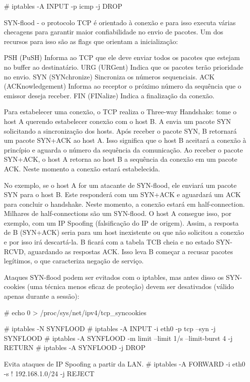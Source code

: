 # iptables -A INPUT -p icmp -j DROP

SYN-flood - o protocolo TCP é orientado à conexão e para isso executa várias checagens para garantir maior confiabilidade no envio de pacotes. Um dos recursos para isso são as flags que orientam a inicialização:

PSH (PuSH) Informa ao TCP que ele deve enviar todos os pacotes que estejam no buffer ao destinatário.
URG (URGent) Indica que os pacotes terão prioridade no envio.
SYN (SYNchronize) Sincroniza os números sequenciais.
ACK (ACKnowledgement) Informa ao receptor o próximo número da sequência que o emissor deseja receber.
FIN (FINalize) Indica a finalização da conexão.

Para estabelecer uma conexão, o TCP realiza o Three-way Handshake: tome o host A querendo estabelecer conexão com o host B. A envia um pacote SYN solicitando a sincronização dos hosts. Após receber o pacote SYN, B retornará um pacote SYN+ACK ao host A. Isso significa que o host B aceitará a conexão à princípio e aguarda o número da sequência da comunicação. Ao receber o pacote SYN+ACK, o host A retorna ao host B a sequência da conexão em um pacote ACK. Neste momento a conexão estará estabelecida.

No exemplo, se o host A for um atacante de SYN-flood, ele enviará um pacote SYN para o host B. Este responderá com um SYN+ACK e aguardará um ACK para concluir o handshake. Neste momento, a conexão estará em half-connection. Milhares de half-connections são um SYN-flood. O host A consegue isso, por exemplo, com um IP Spoofing (falsificação do IP de origem). Assim, a resposta de B (SYN+ACK) seria para um host inexistente ou que não solicitou a conexão e por isso irá descartá-la. B ficará com a tabela TCB cheia e no estado SYN-RCVD, aguardando as respostas ACK. Isso leva B começar a recusar pacotes legítimos, o que caracteriza negação de serviço.

Ataques SYN-flood podem ser evitados com o iptables, mas antes disso os SYN-cookies (uma técnica menos eficaz de proteção) devem ser desativados (válido apenas durante a sessão):

# echo 0 > /proc/sys/net/ipv4/tcp_syncookies

# iptables -N SYNFLOOD
# iptables -A INPUT -i eth0 -p tcp --syn -j SYNFLOOD
# iptables -A SYNFLOOD -m limit --limit 1/s --limit-burst 4 -j RETURN
# iptables -A SYNFLOOD -j DROP

Evita ataques de IP Spoofing a partir da LAN.
# iptables -A FORWARD -i eth0 -s ! 192.168.1.0/24 -j REJECT

